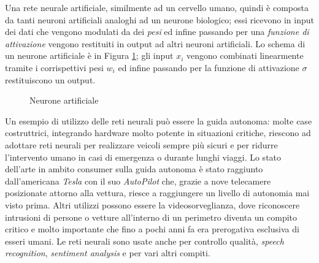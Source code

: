 Una rete neurale artificiale, similmente ad un cervello umano, quindi è composta da tanti neuroni artificiali analoghi ad un neurone biologico; essi ricevono in input dei dati che vengono 
modulati da dei \textit{pesi} ed infine passando per una \textit{funzione di attivazione} vengono restituiti in output ad altri neuroni artificiali. Lo schema di un neurone artificiale è in Figura \ref{fig:neuron_artificial}; gli input $x_i$ vengono combinati linearmente tramite i corrispettivi pesi $w_i$ ed infine passando per la funzione di attivazione $\sigma$ restituiscono un output. 
\begin{figure}
    \centering
    \caption{Neurone artificiale}
    \label{fig:neuron_artificial}
\end{figure}

Un esempio di utilizzo delle reti neurali può essere la guida autonoma: molte case costruttrici, integrando hardware molto potente in situazioni critiche, riescono ad  adottare reti neurali per realizzare veicoli sempre più sicuri e per ridurre l'intervento umano in casi di emergenza o durante lunghi viaggi. 
Lo stato dell'arte in ambito consumer sulla guida autonoma è stato raggiunto dall'americana \textit{Tesla} con il suo \textit{AutoPilot} che, 
grazie a nove telecamere posizionate attorno alla vettura, riesce a raggiungere un livello di autonomia mai visto prima.
Altri utilizzi possono essere la videosorveglianza, dove riconoscere intrusioni di persone o vetture all'interno di un perimetro diventa un compito critico e molto importante che fino a pochi anni fa era prerogativa esclusiva di esseri umani. 
Le reti neurali sono usate anche per controllo qualità, \textit{speech recognition}, \textit{sentiment analysis} e per vari altri compiti. 



